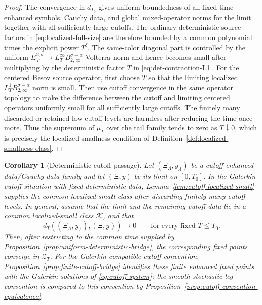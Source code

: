 \documentclass[10pt]{amsart}
\numberwithin{equation}{section}
\theoremstyle{plain}
\newtheorem{corollary}[theorem]{Corollary}
\theoremstyle{definition}
\theoremstyle{remark}
\newcommand{\calZ}{\mathcal{Z}}
\begin{document}
\begin{proof}
The convergence in $d_{T_0}$ gives uniform boundedness of all fixed-time enhanced symbols, Cauchy data, and global mixed-operator norms for the limit together with all sufficiently large cutoffs.  The ordinary deterministic source factors in \eqref{eq:localized-full-size} are therefore bounded by a common polynomial times the explicit power $T^\delta$.  The same-color diagonal part is controlled by the uniform $E_T^{2,\sigma}\to L_T^\infty B_{2,\infty}^{\sigma-\alpha}$ Volterra norm and hence becomes small after multiplying by the deterministic factor $T$ in \eqref{eq:det-contraction-L1}.  For the centered Besov source operator, first choose $T$ so that the limiting localized $L_T^1B_{2,\infty}^{\sigma-\alpha}$ norm is small.  Then use cutoff convergence in the same operator topology to make the difference between the cutoff and limiting centered operators uniformly small for all sufficiently large cutoffs.  The finitely many discarded or retained low cutoff levels are harmless after reducing the time once more.  Thus the supremum of $\mu_T$ over the tail family tends to zero as $T\downarrow0$, which is precisely the localized-smallness condition of Definition~\ref{def:localized-smallness-class}.
\end{proof}

\begin{corollary}[Deterministic cutoff passage]\label{cor:deterministic-cutoff-passage}
Let $(\Xi_\Lambda,y_\Lambda)$ be a cutoff enhanced-data/Cauchy-data family and let $(\Xi,y)$ be its limit on $[0,T_0]$.  In the Galerkin cutoff situation with fixed deterministic data, Lemma~\ref{lem:cutoff-localized-small} supplies the common localized-small class after discarding finitely many cutoff levels.  In general, assume that the limit and the remaining cutoff data lie in a common localized-small class $\mathcal K$, and that
\[
        d_T((\Xi_\Lambda,y_\Lambda),(\Xi,y))\longrightarrow0
        \qquad\text{for every fixed }T\le T_0.
\]
Then, after restricting to the common time supplied by Proposition~\ref{prop:uniform-deterministic-bridge}, the corresponding fixed points converge in $\calZ_T$.  For the Galerkin-compatible cutoff convention, Proposition~\ref{prop:finite-cutoff-bridge} identifies these finite enhanced fixed points with the Galerkin solutions of \eqref{eq:cutoff-system}; the smooth stochastic-leg convention is compared to this convention by Proposition~\ref{prop:cutoff-convention-equivalence}.
\end{corollary}
\end{document}
